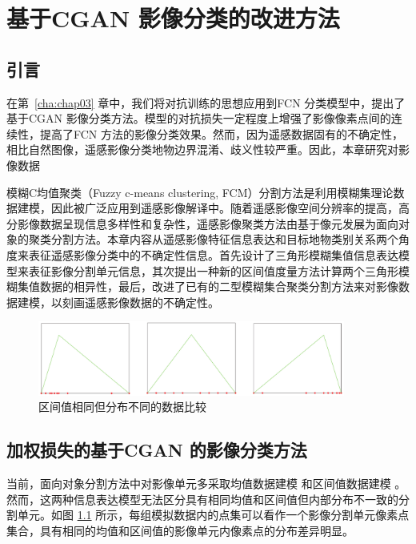 
\chapter{基于CGAN 影像分类的改进方法}
\label{cha:chap04}

\section{引言}
\label{sec:chap04-1}
在第~\ref{cha:chap03} 章中，我们将对抗训练的思想应用到FCN 分类模型中，提出了基于CGAN 影像分类方法。模型的对抗损失一定程度上增强了影像像素点间的连续性，提高了FCN 方法的影像分类效果。然而，因为遥感数据固有的不确定性，相比自然图像，遥感影像分类地物边界混淆、歧义性较严重。因此，本章研究对影像数据


模糊C均值聚类（Fuzzy c-means clustering, FCM）分割方法是利用模糊集理论数据建模，因此被广泛应用到遥感影像解译中\cite{bezdek1984fcm}。随着遥感影像空间分辨率的提高，高分影像数据呈现信息多样性和复杂性，遥感影像聚类方法由基于像元发展为面向对象的聚类分割方法。本章内容从遥感影像特征信息表达和目标地物类别关系两个角度来表征遥感影像分类中的不确定性信息。首先设计了三角形模糊集值信息表达模型来表征影像分割单元信息，其次提出一种新的区间值度量方法计算两个三角形模糊集值数据的相异性，最后，改进了已有的二型模糊集合聚类分割方法来对影像数据建模，以刻画遥感影像数据的不确定性。 

\begin{figure}[htbp]
    \centering
    \includegraphics[width=0.9\textwidth]{figures/compare_distribution}
    \caption{区间值相同但分布不同的数据比较}
    \label{fig:compare_distribution}
\end{figure}

\section{加权损失的基于CGAN 的影像分类方法}
\label{sec:chap04-2}
当前，面向对象分割方法中对影像单元多采取均值数据建模 \cite{yu2012method} 和区间值数据建模 \cite{he2016remote} 。然而，这两种信息表达模型无法区分具有相同均值和区间值但内部分布不一致的分割单元。如图 \ref{fig:compare_distribution} 所示，每组模拟数据内的点集可以看作一个影像分割单元像素点集合，具有相同的均值和区间值的影像单元内像素点的分布差异明显。

